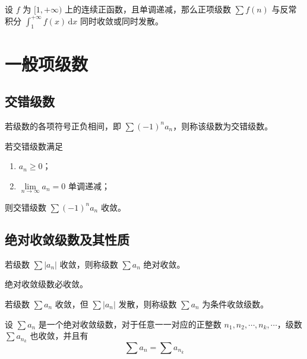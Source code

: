 \begin{theorem}[积分判别法]
    设 $f$ 为 $[1,+\infty)$ 上的连续正函数，且单调递减，那么正项级数 $\sum f(n)$ 与反常积分 $\int_{1}^{+\infty} f(x) \, \mathrm{d}x$ 同时收敛或同时发散。
\end{theorem}

\section{一般项级数}

\subsection{交错级数}

\begin{definition}
    若级数的各项符号正负相间，即 $\sum (-1)^{n} a_{n}$，则称该级数为交错级数。
\end{definition}

\begin{theorem}[莱布尼茨判别法]
    若交错级数满足
    \begin{enumerate}
        \item $a_{n} \geq 0$；
        \item $\lim\limits_{n \to \infty} a_{n} = 0$ 单调递减；
    \end{enumerate}
    则交错级数 $\sum (-1)^{n} a_{n}$ 收敛。
\end{theorem}

\subsection{绝对收敛级数及其性质}

\begin{definition}
    若级数 $\sum |a_{n}|$ 收敛，则称级数 $\sum a_{n}$ 绝对收敛。
\end{definition}

\begin{theorem}
    绝对收敛级数必收敛。
\end{theorem}

\begin{theorem}[条件收敛]
    若级数 $\sum a_{n}$ 收敛，但 $\sum |a_{n}|$ 发散，则称级数 $\sum a_{n}$ 为条件收敛级数。
\end{theorem}

\begin{theorem}[级数的重排]
    设 $\sum a_{n}$ 是一个绝对收敛级数，对于任意一一对应的正整数 $n_{1},n_{2},\cdots,n_{k},\cdots$，级数 $\sum a_{n_{k}}$ 也收敛，并且有
    \begin{equation*}
        \sum a_{n} = \sum a_{n_{k}}
    \end{equation*}
\end{theorem}


